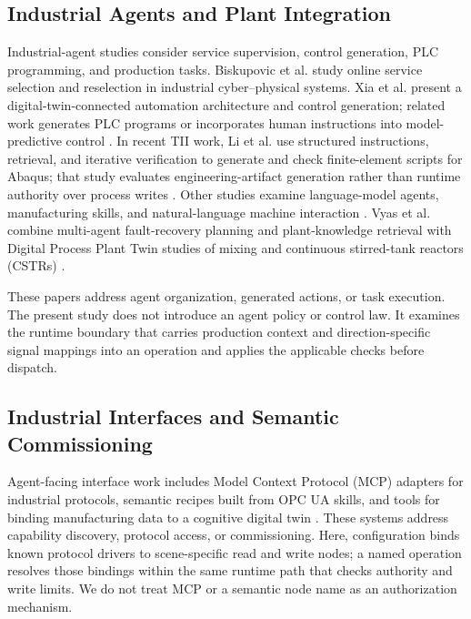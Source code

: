\subsection{Industrial Agents and Plant Integration}
Industrial-agent studies consider service supervision, control generation, PLC programming, and production tasks. Biskupovic et al. study online service selection and reselection in industrial cyber--physical systems. Xia et al. present a digital-twin-connected automation architecture and control generation; related work generates PLC programs or incorporates human instructions into model-predictive control \cite{biskupovic2025supervision,xia2025architecture,xia2025control,liu2026agents4plc,wu2025instructmpc}. In recent TII work, Li et al. use structured instructions, retrieval, and iterative verification to generate and check finite-element scripts for Abaqus; that study evaluates engineering-artifact generation rather than runtime authority over process writes \cite{li2026modsolagent}. Other studies examine language-model agents, manufacturing skills, and natural-language machine interaction \cite{koehle2026llmdriven,lim2025llmenabled,zhao2026shopfloor,hofmann2025nlc,huang2026made}. Vyas et al. combine multi-agent fault-recovery planning and plant-knowledge retrieval with Digital Process Plant Twin studies of mixing and continuous stirred-tank reactors (CSTRs) \cite{vyas2026detection}.

These papers address agent organization, generated actions, or task execution. The present study does not introduce an agent policy or control law. It examines the runtime boundary that carries production context and direction-specific signal mappings into an operation and applies the applicable checks before dispatch.

\subsection{Industrial Interfaces and Semantic Commissioning}
Agent-facing interface work includes Model Context Protocol (MCP) adapters for industrial protocols, semantic recipes built from OPC UA skills, and tools for binding manufacturing data to a cognitive digital twin \cite{silva2025mcpmanufacturing,koehle2025semanticrecipes,xavier2026industriConnect,liu2026semanticcommissioning}. These systems address capability discovery, protocol access, or commissioning. Here, configuration binds known protocol drivers to scene-specific read and write nodes; a named operation resolves those bindings within the same runtime path that checks authority and write limits. We do not treat MCP or a semantic node name as an authorization mechanism.

